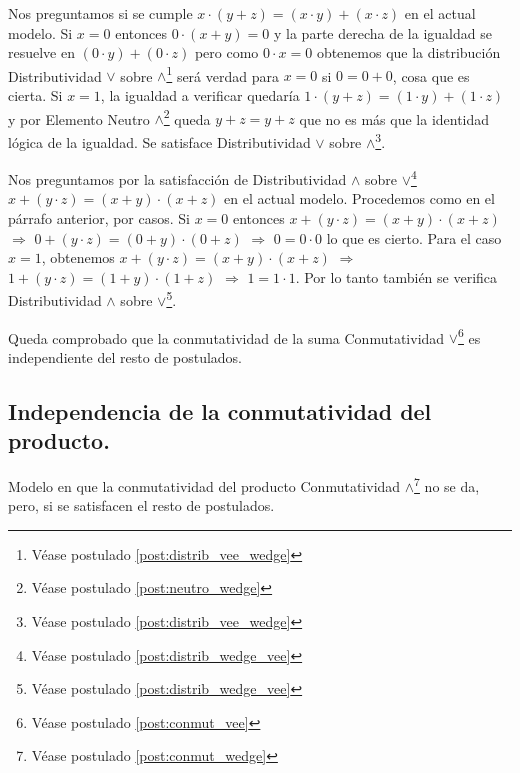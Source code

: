 	Nos preguntamos si se cumple \( x \cdot ( y + z ) = ( x \cdot y ) + ( x
\cdot z ) \) en el actual modelo. Si \(x = 0\) entonces \( 0 \cdot (x + y) =
0 \) y la parte derecha de la igualdad se resuelve en \( ( 0 \cdot y ) + ( 0
\cdot z ) \) pero como \( 0 \cdot x = 0 \) obtenemos que la distribución
Distributividad $\vee$ sobre $\wedge$\footnote{Véase postulado \ref{post:distrib_vee_wedge}} será verdad para \(x = 0\) si \( 0 = 0 + 0 \), cosa que es
cierta. Si \( x = 1 \), la igualdad a verificar quedaría \( 1 \cdot ( y + z )
= ( 1 \cdot y ) + ( 1 \cdot z ) \) y por Elemento Neutro $\wedge$\footnote{Véase postulado \ref{post:neutro_wedge}} queda \( y + z  =  y
+ z \) que no es más que la identidad lógica de la igualdad. Se satisface
Distributividad $\vee$ sobre $\wedge$\footnote{Véase postulado \ref{post:distrib_vee_wedge}}.



	Nos preguntamos por la satisfacción de Distributividad $\wedge$ sobre $\vee$\footnote{Véase postulado \ref{post:distrib_wedge_vee}} \( x + ( y \cdot z
) = ( x + y ) \cdot ( x + z ) \) en el actual modelo. Procedemos como en el
párrafo anterior, por casos. Si \(x = 0\) entonces \( x + ( y \cdot z ) = ( x
+ y ) \cdot ( x + z ) \) \(\Longrightarrow\) \(0 + ( y \cdot z ) = ( 0 + y )
\cdot ( 0 + z )\) \(\Longrightarrow\) \( 0 = 0 \cdot 0\) lo que es cierto.
Para el caso \(x = 1\),  obtenemos \( x + ( y \cdot z ) = ( x + y ) \cdot ( x
+ z ) \) \(\Longrightarrow\) \( 1 + ( y \cdot z ) = ( 1 + y ) \cdot ( 1 + z
)\) \(\Longrightarrow\) \( 1 = 1 \cdot 1 \). Por lo tanto también se verifica
Distributividad $\wedge$ sobre $\vee$\footnote{Véase postulado \ref{post:distrib_wedge_vee}}.



	Queda comprobado que la conmutatividad de la suma Conmutatividad $\vee$\footnote{Véase postulado \ref{post:conmut_vee}} es independiente del resto de postulados.



\subsection{Independencia de la conmutatividad del producto.}



	Modelo en que la conmutatividad del producto Conmutatividad $\wedge$\footnote{Véase postulado \ref{post:conmut_wedge}} no se da,
pero, si se satisfacen el resto de postulados.



